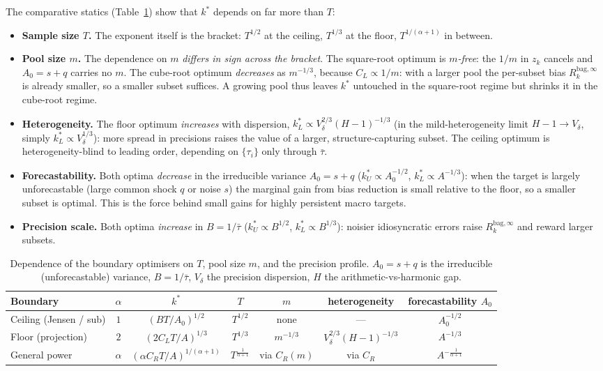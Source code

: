 \documentclass[12pt,a4paper]{article}
\theoremstyle{definition}
\newcommand{\Rk}{R_k^{\mathrm{bag},\infty}}
\begin{document}
The comparative statics (Table~\ref{tab:kdep}) show that $k^*$ depends on far
more than $T$:
\begin{itemize}
\item \textbf{Sample size $T$.} The exponent itself is the bracket: $T^{1/2}$
  at the ceiling, $T^{1/3}$ at the floor, $T^{1/(\alpha+1)}$ in between.
\item \textbf{Pool size $m$.} The dependence on $m$ \emph{differs in sign
  across the bracket}. The square-root optimum is \emph{$m$-free}: the $1/m$ in
  $z_k$ cancels and $A_0=s+q$ carries no $m$. The cube-root optimum
  \emph{decreases} as $m^{-1/3}$, because $C_L\propto1/m$: with a larger pool
  the per-subset bias $\Rk$ is already smaller, so a smaller subset suffices.
  A growing pool thus leaves $k^*$ untouched in the square-root regime but
  shrinks it in the cube-root regime.
\item \textbf{Heterogeneity.} The floor optimum \emph{increases} with
  dispersion, $k^*_L\propto V_\delta^{2/3}(H-1)^{-1/3}$ (in the
  mild-heterogeneity limit $H-1\to V_\delta$, simply
  $k^*_L\propto V_\delta^{1/3}$): more spread in precisions raises the value of
  a larger, structure-capturing subset. The ceiling optimum is
  heterogeneity-blind to leading order, depending on $\{\tau_i\}$ only through
  $\bar\tau$.
\item \textbf{Forecastability.} Both optima \emph{decrease} in the irreducible
  variance $A_0=s+q$ ($k^*_U\propto A_0^{-1/2}$, $k^*_L\propto A^{-1/3}$): when
  the target is largely unforecastable (large common shock $q$ or noise $s$)
  the marginal gain from bias reduction is small relative to the floor, so a
  smaller subset is optimal. This is the force behind small gains for highly
  persistent macro targets.
\item \textbf{Precision scale.} Both optima \emph{increase} in $B=1/\bar\tau$
  ($k^*_U\propto B^{1/2}$, $k^*_L\propto B^{1/3}$): noisier idiosyncratic
  errors raise $\Rk$ and reward larger subsets.
\end{itemize}

\begin{table}[t]
\centering
\caption{Dependence of the boundary optimisers on $T$, pool size $m$, and the
precision profile. $A_0=s+q$ is the irreducible (unforecastable) variance,
$B=1/\bar\tau$, $V_\delta$ the precision dispersion, $H$ the
arithmetic-vs-harmonic gap.}
\label{tab:kdep}
\begin{tabular}{lcccccc}
\hline
Boundary & $\alpha$ & $k^*$ & $T$ & $m$ & heterogeneity & forecastability $A_0$\\
\hline
Ceiling (Jensen / sub) & $1$ & $(BT/A_0)^{1/2}$ & $T^{1/2}$ & none & --- & $A_0^{-1/2}$\\
Floor (projection) & $2$ & $(2C_LT/A)^{1/3}$ & $T^{1/3}$ & $m^{-1/3}$ &
   $V_\delta^{2/3}(H{-}1)^{-1/3}$ & $A^{-1/3}$\\
General power & $\alpha$ & $(\alpha C_RT/A)^{1/(\alpha+1)}$ &
   $T^{\frac{1}{\alpha+1}}$ & via $C_R(m)$ & via $C_R$ & $A^{-\frac{1}{\alpha+1}}$\\
\hline
\end{tabular}
\end{table}
\end{document}
